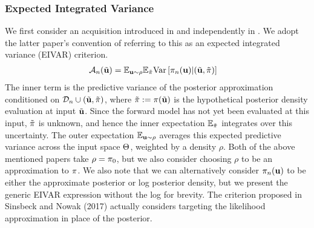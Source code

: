 \documentclass[12pt]{article}
\begin{document}
\subsubsection{Expected Integrated Variance}
We first consider an acquisition introduced in \cite{SinsbeckNowak} and independently 
in \cite{sürer2023sequential}. We adopt the latter paper's convention of referring to this as an expected integrated variance (EIVAR) criterion. 
\begin{align}
\mathcal{A}_{n}(\tilde{\mathbf{u}}) &= \mathbb{E}_{\mathbf{u} \sim \rho} \mathbb{E}_{\tilde{\pi}} \mathrm{Var}\left[\pi_{n}(\mathbf{u}) | (\tilde{\mathbf{u}}, \tilde{\pi}) \right] \label{EIVAR}
\end{align}
The inner term is the predictive variance of the posterior approximation conditioned on $\mathcal{D}_{n} \cup (\tilde{\mathbf{u}}, \tilde{\pi})$, where 
$\tilde{\pi} := \pi(\tilde{\mathbf{u}})$ is the hypothetical posterior density evaluation at input $\tilde{\mathbf{u}}$. Since the forward model has not yet been evaluated at 
this input, $\tilde{\pi}$ is unknown, and hence the inner expectation $\mathbb{E}_{\tilde{\pi}}$ integrates over this uncertainty. The outer expectation $\mathbb{E}_{\mathbf{u} \sim \rho}$
averages this expected predictive variance across the input space $\Theta$, weighted by a density $\rho$. Both of the above mentioned papers take $\rho = \pi_0$, but we 
also consider choosing $\rho$ to be an approximation to $\pi$. We also note that we can alternatively consider $\pi_{n}(\mathbf{u})$ to be either the 
approximate posterior or log posterior density, but we present the generic EIVAR expression without the log for brevity. The criterion proposed in Sinsbeck and Nowak (2017) actually 
considers targeting the likelihood approximation in place of the posterior. 
\end{document}
